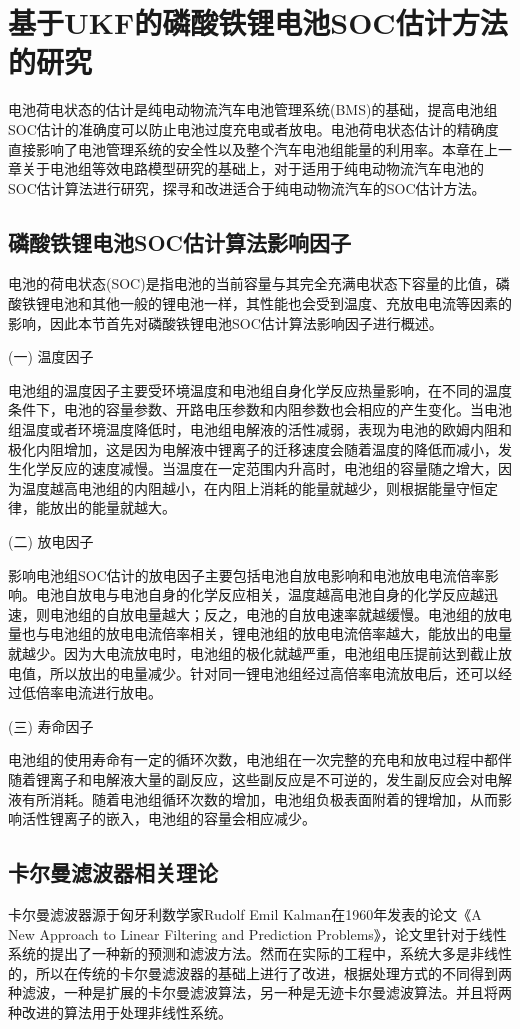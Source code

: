 
\chapter{基于UKF的磷酸铁锂电池SOC估计方法的研究}
电池荷电状态的估计是纯电动物流汽车电池管理系统(BMS)的基础，提高电池组SOC估计的准确度可以防止电池过度充电或者放电。电池荷电状态估计的精确度直接影响了电池管理系统的安全性以及整个汽车电池组能量的利用率。本章在上一章关于电池组等效电路模型研究的基础上，对于适用于纯电动物流汽车电池的SOC估计算法进行研究，探寻和改进适合于纯电动物流汽车的SOC估计方法。
\section{磷酸铁锂电池SOC估计算法影响因子}
电池的荷电状态(SOC)是指电池的当前容量与其完全充满电状态下容量的比值，磷酸铁锂电池和其他一般的锂电池一样，其性能也会受到温度、充放电电流等因素的影响，因此本节首先对磷酸铁锂电池SOC估计算法影响因子进行概述。

(一)	温度因子

	电池组的温度因子主要受环境温度和电池组自身化学反应热量影响，在不同的温度条件下，电池的容量参数、开路电压参数和内阻参数也会相应的产生变化。当电池组温度或者环境温度降低时，电池组电解液的活性减弱，表现为电池的欧姆内阻和极化内阻增加，这是因为电解液中锂离子的迁移速度会随着温度的降低而减小，发生化学反应的速度减慢。当温度在一定范围内升高时，电池组的容量随之增大，因为温度越高电池组的内阻越小，在内阻上消耗的能量就越少，则根据能量守恒定律，能放出的能量就越大。

(二)	放电因子

	影响电池组SOC估计的放电因子主要包括电池自放电影响和电池放电电流倍率影响。电池自放电与电池自身的化学反应相关，温度越高电池自身的化学反应越迅速，则电池组的自放电量越大；反之，电池的自放电速率就越缓慢。电池组的放电量也与电池组的放电电流倍率相关，锂电池组的放电电流倍率越大，能放出的电量就越少。因为大电流放电时，电池组的极化就越严重，电池组电压提前达到截止放电值，所以放出的电量减少。针对同一锂电池组经过高倍率电流放电后，还可以经过低倍率电流进行放电。

(三)	寿命因子

	电池组的使用寿命有一定的循环次数，电池组在一次完整的充电和放电过程中都伴随着锂离子和电解液大量的副反应，这些副反应是不可逆的，发生副反应会对电解液有所消耗。随着电池组循环次数的增加，电池组负极表面附着的锂增加，从而影响活性锂离子的嵌入，电池组的容量会相应减少。
\section{卡尔曼滤波器相关理论}
卡尔曼滤波器源于匈牙利数学家Rudolf Emil Kalman在1960年发表的论文《A New Approach to Linear Filtering and Prediction Problems》，论文里针对于线性系统的提出了一种新的预测和滤波方法。然而在实际的工程中，系统大多是非线性的，所以在传统的卡尔曼滤波器的基础上进行了改进，根据处理方式的不同得到两种滤波，一种是扩展的卡尔曼滤波算法，另一种是无迹卡尔曼滤波算法。并且将两种改进的算法用于处理非线性系统。
